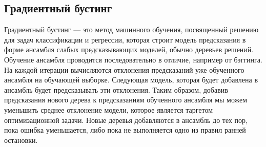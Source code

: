 \iffalse
Фундаментальная идея метода опорных векторов заключается в поиске гиперплоскости с "лучшим" отступом. расстоянием между гиперплоскостью и опорными векторами -- векторами, которые ближе всего находятся к разделяющей гиперплоскости. 
\newline
Если выборка линейно разделима, то гиперплоскость, разделяющая два класса, имеет вид:
\[
\langle x,w\rangle + b = 0
\]
Для надежного разделения классов необходимо, чтобы расстояние между разделяющими гиперплоскостями было как можно большим, т.е. $\norm{w}$ было как можно меньше. Таким образом ставится задача нахождения минимума квадратичного функционала $ \frac{\langle w,w\rangle}{2} $.
\newline
Если же выборка линейно неразделима, то применяется т.н. ядерный трюк -- пространство признаков вкладывается в пространство большей размерности $H$ с помощью отображения $\varphi: X \to H$. Полагают, что $H$ -- гильбертово пространство, и тогда, рассматривая алгоритм опорных векторов для образов $\varphi(x_i)$ решение задачи сводится к линейно разделимому случаю, т.е. разделяющая функция ищется в виде:
\[
f(x) = \langle w,\varphi(x)\rangle + b
\]
Неоспоримым плюсом этого метода является то, что он сводится к решению задачи квадратичного программирования в выпуклой области, которая всегда имеет единственное решение.\fi 

\subsection{\centering Градиентный бустинг}
Градиентный бустинг — это метод машинного обучения, посвященный решению для задач классификации и регрессии, которая строит модель предсказания в форме ансамбля слабых предсказывающих моделей, обычно деревьев решений. Обучение
ансамбля проводится последовательно в отличие, например от бэггинга. На
каждой итерации вычисляются отклонения предсказаний уже обученного ансамбля на обучающей выборке. Следующая модель, которая будет добавлена в ансамбль будет предсказывать эти отклонения. Таким образом, добавив
предсказания нового дерева к предсказаниям обученного ансамбля мы можем
уменьшить среднее отклонение модели, которое является таргетом оптимизационной задачи. Новые деревья добавляются в ансамбль до тех пор, пока ошибка
уменьшается, либо пока не выполняется одно из правил ранней остановки.


